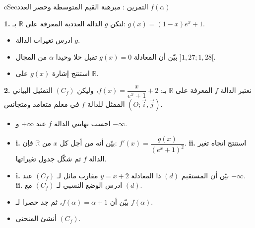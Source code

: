 \documentclass[12pt,a4paper]{article}
\newenvironment{BOX}[2]{\begin{otherlanguage}{english}\begin{arbox}{#1}{#2}}{\end{arbox}\end{otherlanguage}}
\newcounter{exo}
\newenvironment{tamrin}[1]{\stepcounter{exo}\begin{BOX}{cSec}{التمرين \theexo: #1}}{\end{BOX}}
\newcommand{\R}{\mathbb{R}}
\newenvironment{sq}{\begin{itemize}[leftmargin=2.4em,itemsep=3pt]}{\end{itemize}}
\newcommand{\qa}{\item[(أ)]}\newcommand{\qb}{\item[(ب)]}\newcommand{\qc}{\item[(جـ)]}\newcommand{\qd}{\item[(د)]}\newcommand{\qe}{\item[(هـ)]}
\newcommand{\QQ}[1]{\par\smallskip\textbf{#1.} }
\begin{document}
\begin{tamrin}{مبرهنة القيم المتوسطة وحصر العدد $f(\alpha)$}
\QQ{1} لتكن $g$ الدالة العددية المعرفة على $\R$ بـ: $g(x)=(1-x)e^{x}+1$.
\begin{sq}
\qa ادرس تغيرات الدالة $g$.
\qb بيّن أن المعادلة $g(x)=0$ تقبل حلا وحيدا $\alpha$ من المجال $]1{,}27;1{,}28[$.
\qc استنتج إشارة $g(x)$ على $\R$.
\end{sq}
\QQ{2} نعتبر الدالة $f$ المعرفة على $\R$ بـ: $f(x)=\dfrac{x}{e^{x}+1}+2$، وليكن $(C_f)$ التمثيل البياني الممثل للدالة $f$ في معلم متعامد ومتجانس $\left(O;\vec i,\vec j\right)$.
\begin{sq}
\qa احسب نهايتي الدالة $f$ عند $+\infty$ و $-\infty$.
\qb \textbf{i.} بيّن أنه من أجل كل $x$ من $\R$ فإن: $f'(x)=\dfrac{g(x)}{\left(e^{x}+1\right)^{2}}$. \quad \textbf{ii.} استنتج اتجاه تغير الدالة $f$ ثم شكّل جدول تغيراتها.
\qc \textbf{i.} بيّن أن المستقيم $(d)$ ذا المعادلة $y=x+2$ مقارب مائل لـ $(C_f)$ عند $-\infty$. \quad \textbf{ii.} ادرس الوضع النسبي لـ $(C_f)$ مع $(d)$.
\qd بيّن أن $f(\alpha)=\alpha+1$، ثم جد حصرا لـ $f(\alpha)$.
\qe أنشئ المنحنى $(C_f)$.
\end{sq}
\end{tamrin}
\end{document}
